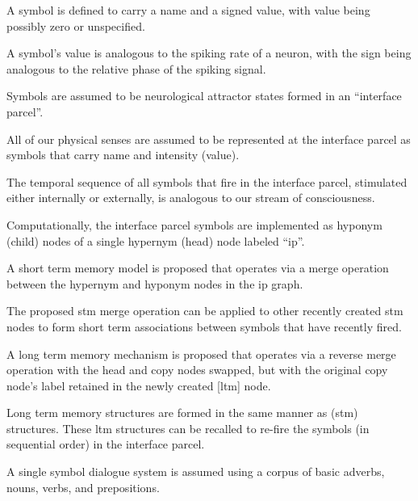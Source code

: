 \documentclass{clv3}
\begin{document}
\begin{unenumerate}

\item A symbol is defined to carry a name and a signed value, with value being possibly zero or unspecified.

\item A symbol’s value is analogous to the spiking rate of a neuron, with the sign being analogous to the relative phase of the spiking signal.
 
\item Symbols are assumed to be neurological attractor states formed in an “interface parcel”.  

\item All of our physical senses are assumed to be represented at the interface parcel as symbols that carry  name and intensity (value). 

\item The temporal sequence of all symbols that fire in the interface parcel, stimulated either internally or externally, is analogous to our stream of consciousness.

\item Computationally,  the interface parcel symbols are implemented as hyponym (child)  nodes of a single hypernym (head) node labeled “ip”.

\item A short term memory model is proposed that operates via a merge operation between the hypernym and hyponym nodes in the ip graph.  

\item The proposed stm merge operation can be applied to other recently created stm nodes to form short term associations between symbols that have recently fired.

\item A long term memory mechanism is proposed that operates via a reverse merge operation with the head and copy nodes swapped, but with the original copy node’s label retained in the newly created [ltm] node.

\item Long term memory structures are formed in the same manner as (stm) structures.   These ltm structures can be recalled to re-fire the symbols (in sequential order) in the interface parcel.

\item A single symbol dialogue system is assumed using a corpus of basic adverbs, nouns, verbs, and prepositions.  


\end{unenumerate}
\end{document}
